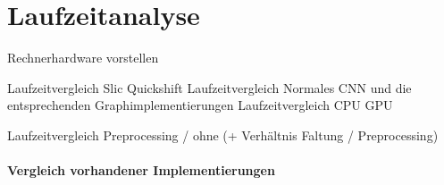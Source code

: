 \section{Laufzeitanalyse}
\label{laufzeitanalyse}

Rechnerhardware vorstellen

Laufzeitvergleich Slic Quickshift
Laufzeitvergleich Normales CNN und die entsprechenden Graphimplementierungen
Laufzeitvergleich CPU GPU

Laufzeitvergleich Preprocessing / ohne (+ Verhältnis Faltung / Preprocessing)



\paragraph{Vergleich \bzgl{} vorhandener Implementierungen}
\label{vergleich_laufzeit}


